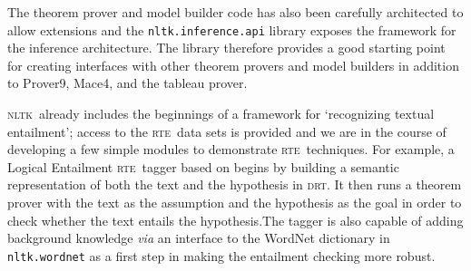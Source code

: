 \documentclass[11pt, a4paper]{article}
\newcommand{\DRT}{\textsc{drt}}
\newcommand{\NLTK}{\textsc{nltk}}
\newcommand{\RTE}{\textsc{rte}}
\begin{document}
The theorem prover and model builder code has also been carefully
archi\-tected to allow extensions and the \texttt{nltk.inference.api}
library exposes the framework for the inference architecture.  The
library therefore provides a good starting point for creating
interfaces with other theorem provers and model builders in addition 
to Prover9, Mace4, and the tableau prover.

\NLTK\ already includes the beginnings of a framework for `recognizing
textual entailment'; access to the \RTE\ data sets is provided and we
are in the course of developing a few simple modules to demonstrate
\RTE\ techniques.  For example, a Logical Entailment \RTE\ tagger
based on \cite{BosRTE} begins by building a semantic
representation of both the text and the hypothesis in \DRT.  It then
runs a theorem prover with the text as the assumption and the
hypothesis as the goal in order to check whether the text entails the
hypothesis.The tagger is also capable of adding background knowledge
\textit{via} an interface to the WordNet dictionary in
\texttt{nltk.wordnet} as a first step in making the entailment
checking more robust.


{\small

}
\end{document}
